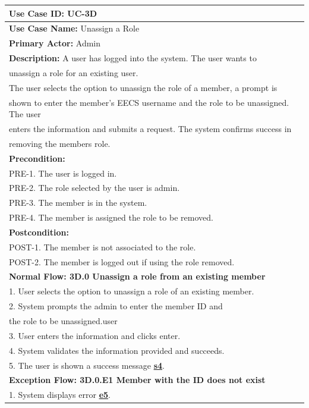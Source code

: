 \documentclass[fontsize=12pt,paper=letter,twoside]{scrartcl}
\begin{document}
\begin{table}[!htb]
\begin{center}
\begin{tabular}{|l|l|}
\hline
\textbf{Use Case ID:} UC-3D \\ \hline
\textbf{Use Case Name:} Unassign a Role \\ \hline
\textbf {Primary Actor:} Admin \\ \hline
\textbf{Description:} A user has logged into the system. The user wants to \\unassign a role for an existing user. \\The user selects the option to unassign the role of a member, a prompt is \\shown to enter the member's EECS username and the role to be unassigned. The user \\enters the information and submits a request. The system confirms success in \\removing the members role.\\ \hline
\textbf{Precondition:}
\\ PRE-1. The user is logged in.
\\ PRE-2. The role selected by the user is admin.
\\ PRE-3. The member is in the system.
\\ PRE-4. The member is assigned the role to be removed. \\ \hline
\textbf{Postcondition:}
\\ POST-1. The member is not associated to the role.
\\ POST-2. The member is logged out if using the role removed. \\ \hline
\textbf{Normal Flow: 3D.0 Unassign a role from an existing member}
\\ 1. User selects the option to unassign a role of an existing member.
\\ 2. System prompts the admin to enter the member ID and 
\\ the role to be unassigned.user
\\ 3. User enters the information and clicks enter.
\\ 4. System validates the information provided and succeeds.
\\ 5. The user is shown a success message \hyperref[app:success]{\textbf{s4}}.
\\ \hline
\textbf{Exception Flow: 3D.0.E1 Member with the ID does not exist}
\\ 1. System displays error \hyperref[app:error]{\textbf{e5}}.

\end{tabular}
\end{center}
\end{table}
\end{document}
